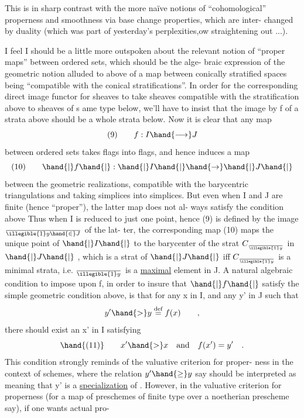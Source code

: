 
This is in sharp contrast with the more naïve notions of ``cohomological''
properness and smoothness via base change properties, which are inter-%
changed by duality (which was part of yesterday's perplexities,ow
straightening out ...).

I feel I should be a little more outspoken about the relevant
notion of ``proper maps'' between ordered sets, which should be the alge-%
braic expression of the geometric notion alluded to above\hand{,} of a map
between conically stratified spaces being ``compatible with the conical
stratifications''. In order for the corresponding direct image functor
for sheaves to take sheaves compatible with the stratification above to
sheaves of s ame type below, we'll have to insist that the image by f
of a strata above should be a whole strata below. Now it is clear that
any map
\[ (9) \qquad f: I \hand{\longrightarrow} J \]
between ordered sets  takes flags into flags, and hence induces
a map
\[ (10) \qquad \hand{|}f\hand{|}:\hand{|}I\hand{|}\hand{\to}\hand{|}J\hand{|} \]
between the geometric realizations, compatible with the barycentric
triangulations and   taking simplices into simplices. But even
when I and J are finite (hence ``proper''), the latter map does not al-%
ways satisfy the condition above  Thus when I is reduced to
just one point, hence (9) is defined  by the image $\over{\illegible{1}}{y}\hand{\in} J$ of the lat-%
ter, the corresponding map (10) maps the unique point of $\hand{|}I\hand{|}$ to the
barycenter of the strat $C_{\over{\illegible{1}}{y}}$ in $\hand{|}J\hand{|}$ , which is a strat of $\hand{|}J\hand{|}$ iff
 $C_{\over{\illegible{1}}{y}}$ is a minimal strata, i.e. $\over{\illegible{1}}{y}$ is a \uline{maximal} element in J.
A natural algebraic condition to impose upon f, in order to insure
that $\hand{|}f\hand{|}$ satisfy the simple geometric condition above, is that for
any x in I, and any y' in J such that
\[ y' \hand{>} y \overset{\text{def}}{=} f(x) \qquad , \]
there should exist an x' in I satisfying
\[ \hand{(11)} \qquad x' \hand{>} x \quad \text{and} \quad f(x') = y' \quad . \]
This condition strongly reminds of the valuative criterion for proper-%
ness in the context of schemes, where the relation $y' \hand{\geq} y$ \hand{,} say\hand{,} should
be interpreted as meaning that y' is a \uline{specialization} of  . However,
in the valuative criterion for properness (for a map of preschemes of
finite type over a noetherian prescheme say), if one wants actual pro-%


